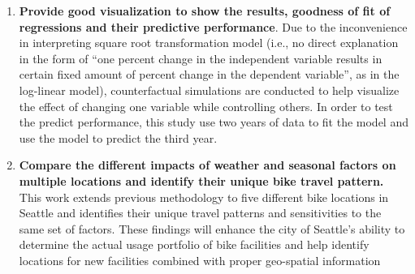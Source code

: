 \documentclass [11pt, proquest] {uwthesis}[2015/03/03]
\begin{document}
\begin{enumerate}
\item \textbf{Provide good visualization to show the results, goodness of fit of regressions and their predictive performance}. Due to the inconvenience in interpreting square root transformation model (i.e., no direct explanation in the form of ``one percent change in the independent variable results in certain fixed amount of percent change in the dependent variable'', as in the log-linear model), counterfactual simulations are conducted to help visualize the effect of changing one variable while controlling others. In order to test the predict performance, this study use two years of data to fit the model and use the model to predict the third year. 


\item \textbf{Compare the different impacts of weather and seasonal factors on multiple locations and identify their unique bike travel pattern.} This work extends previous methodology to five different bike locations in Seattle and identifies their unique travel patterns and sensitivities to the same set of factors. These findings will enhance the city of Seattle's ability to determine the actual usage portfolio of bike facilities and help identify locations for new facilities combined with proper geo-spatial information 




\end{enumerate}
 
\end{document}
